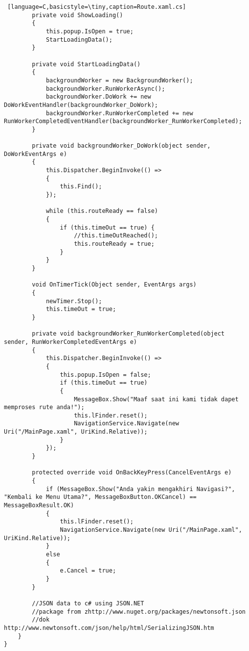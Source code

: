 \begin{lstlisting} [language=C,basicstyle=\tiny,caption=Route.xaml.cs]
        private void ShowLoading()
        {
            this.popup.IsOpen = true;
            StartLoadingData();
        }

        private void StartLoadingData()
        {
            backgroundWorker = new BackgroundWorker();
            backgroundWorker.RunWorkerAsync();
            backgroundWorker.DoWork += new DoWorkEventHandler(backgroundWorker_DoWork);
            backgroundWorker.RunWorkerCompleted += new RunWorkerCompletedEventHandler(backgroundWorker_RunWorkerCompleted);
        }

        private void backgroundWorker_DoWork(object sender, DoWorkEventArgs e)
        {
            this.Dispatcher.BeginInvoke(() =>
            {
                this.Find();
            });
            
            while (this.routeReady == false)
            {
                if (this.timeOut == true) {
                    //this.timeOutReached();
                    this.routeReady = true;
                }
            }
        }

        void OnTimerTick(Object sender, EventArgs args)
        {
            newTimer.Stop();
            this.timeOut = true;
        }

        private void backgroundWorker_RunWorkerCompleted(object sender, RunWorkerCompletedEventArgs e)
        {
            this.Dispatcher.BeginInvoke(() =>
            {
                this.popup.IsOpen = false;
                if (this.timeOut == true)
                {
                    MessageBox.Show("Maaf saat ini kami tidak dapet memproses rute anda!");
                    this.lFinder.reset();
                    NavigationService.Navigate(new Uri("/MainPage.xaml", UriKind.Relative));
                }
            });
        }

        protected override void OnBackKeyPress(CancelEventArgs e)
        {
            if (MessageBox.Show("Anda yakin mengakhiri Navigasi?", "Kembali ke Menu Utama?", MessageBoxButton.OKCancel) == MessageBoxResult.OK)
            {
                this.lFinder.reset();
                NavigationService.Navigate(new Uri("/MainPage.xaml", UriKind.Relative));
            }
            else
            {
                e.Cancel = true;
            }
        }

        //JSON data to c# using JSON.NET
        //package from zhttp://www.nuget.org/packages/newtonsoft.json
        //dok http://www.newtonsoft.com/json/help/html/SerializingJSON.htm
    }
}
\end{lstlisting}

